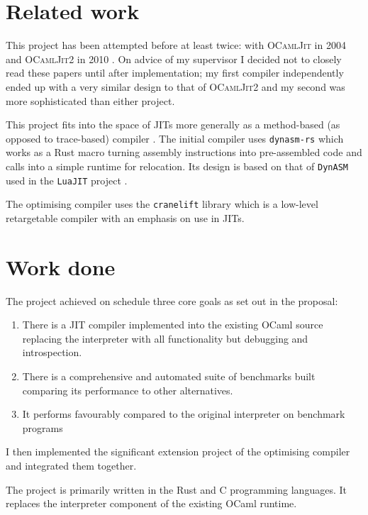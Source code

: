 \section{Related work}

This project has been attempted before at least twice: with \textsc{OCamlJit} in 2004 \cite{ocjit1}
and \textsc{OCamlJit2} in 2010 \cite{ocjit2}. On advice of my supervisor I decided not to closely
read these papers until after implementation; my first compiler independently ended up with a very
similar design to that of \textsc{OCamlJit2} and my second was more sophisticated than either
project.

This project fits into the space of JITs more generally as a method-based (as opposed to
trace-based) compiler \cite{pyket}. The initial compiler uses \texttt{dynasm-rs} \cite{dynasmrs}
which works as a Rust macro turning assembly instructions into pre-assembled code and calls into
a simple runtime for relocation. Its design is based on that of \texttt{DynASM} used in the
\texttt{LuaJIT} project \cite{dynasm}.

The optimising compiler uses the \texttt{cranelift} \cite{cranelift}
library which is a low-level retargetable compiler with an emphasis on use in JITs.

\section{Work done}

The project achieved on schedule three core goals as set out in the proposal:

\begin{enumerate}
      \item There is a JIT compiler implemented into the existing OCaml source
            replacing the interpreter with all functionality but debugging
            and introspection.
      \item There is a comprehensive and automated suite of benchmarks built
            comparing its performance to other alternatives.
      \item It performs favourably compared to the original interpreter on benchmark programs
\end{enumerate}

I then implemented the significant extension project of the optimising compiler and integrated
them together.

The project is primarily written in the Rust and C programming languages. It replaces the
interpreter component of the existing OCaml runtime.

